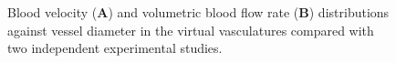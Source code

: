 \documentclass[11pt,]{article}
\begin{document}
\begin{figure}[ht!]
  \centering
  \begin{subfigure}[t]{.02\textwidth}
  \end{subfigure}
  \begin{subfigure}[t]{.45\textwidth}
  \end{subfigure}
  \hfill
  \begin{subfigure}[t]{.02\textwidth}
  \end{subfigure}
  \begin{subfigure}[t]{.45\textwidth}
  \end{subfigure}
  \hfill

  \caption{\label{fig:Flow-Velocity-dist}Blood velocity (\textbf{A}) and volumetric blood flow rate (\textbf{B}) distributions against vessel diameter in the virtual vasculatures compared with two independent experimental studies\cite{DoblhoffDier2014,Riva1985}.}
\end{figure}
\end{document}
